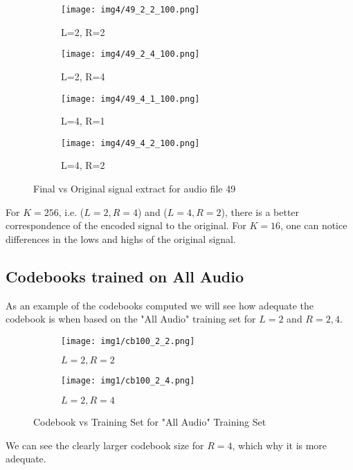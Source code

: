 \documentclass[a4paper, 11pt]{article}
\begin{document}
			\begin{figure}[H]
				\begin{subfigure}{.24\textwidth}
					\centering
					\texttt{[image: img4/49\_2\_2\_100.png]}  
					\caption{L=2, R=2}
					\label{fig:sub-first}
				\end{subfigure}
				\begin{subfigure}{.24\textwidth}
					\centering
					\texttt{[image: img4/49\_2\_4\_100.png]}  
					\caption{L=2, R=4}
					\label{fig:sub-second}
				\end{subfigure}
				\begin{subfigure}{.24\textwidth}
					\centering
					\texttt{[image: img4/49\_4\_1\_100.png]}  
					\caption{L=4, R=1}
					\label{fig:sub-third}
				\end{subfigure}
				\begin{subfigure}{.24\textwidth}
					\centering
					\texttt{[image: img4/49\_4\_2\_100.png]}  
					\caption{L=4, R=2}
					\label{fig:sub-fourth}
				\end{subfigure}
				\caption{Final vs Original signal extract for audio file 49}
				\label{fig:fig49}
			\end{figure}
			For $ K=256 $, i.e. ($ L=2,R=4 $) and ($ L=4,R=2 $), there is a better correspondence of the encoded signal to the original.
			For $ K = 16 $, one can notice differences in the lows and highs of the original signal.
			
		\subsection{Codebooks trained on All Audio}
			As an example of the codebooks computed we will see how adequate the codebook is when based on the "All Audio" training set for $ L=2 $ and $ R=2,4 $.
			\begin{figure}[H]
				\begin{subfigure}{.49\textwidth}
					\centering
					\texttt{[image: img1/cb100\_2\_2.png]}  
					\caption{$ L=2, R=2 $}
					\label{fig:sub-first2}
				\end{subfigure}
				\begin{subfigure}{.49\textwidth}
					\centering
					\texttt{[image: img1/cb100\_2\_4.png]}  
					\caption{$ L=2, R=4 $}
					\label{fig:sub-second2}
				\end{subfigure}
				\caption{Codebook vs Training Set for "All Audio" Training Set}
				\label{fig:fig100}
			\end{figure}
			We can see the clearly larger codebook size for $ R=4 $, which why it is more adequate.
		
\end{document}
